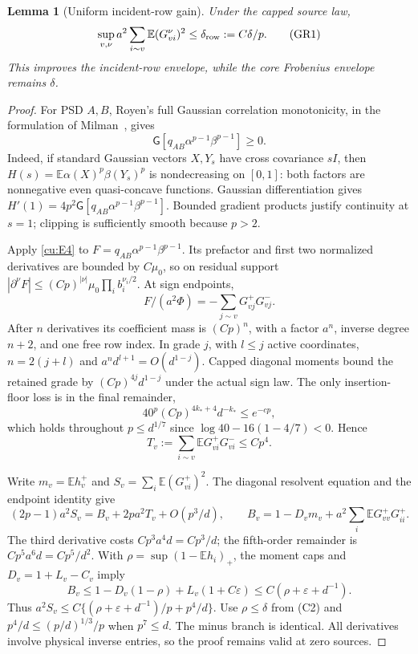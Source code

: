 \documentclass[10pt]{article}
\numberwithin{equation}{section}
\newtheorem{lemma}{Lemma}[section]
\newcommand{\1}{\mathbf1}
\begin{document}
\begin{lemma}[Uniform incident-row gain]\label{lem:global-row-gain}
Under the capped source law,
\[
 \sup_{v,\nu}a^2\sum_{i\sim v}\mathbb E(G^\nu_{vi})^2
 \le\delta_{\rm row}:=C\delta/p.
 \tag{GR1}\label{eq:global-row-gain}
\]
This improves the incident-row envelope, while the core Frobenius
envelope remains $\delta$.
\end{lemma}
\begin{proof}
For PSD $A,B$, Royen's full Gaussian correlation monotonicity,
in the formulation of Milman~\cite[Section 3.3]{Milman}, gives
\[
 \mathsf G[q_{AB}\alpha^{p-1}\beta^{p-1}]\ge0.
\]
Indeed, if standard Gaussian vectors $X,Y_s$ have cross covariance
$sI$, then $H(s)=\mathbb E\alpha(X)^p\beta(Y_s)^p$ is nondecreasing
on $[0,1]$: both factors are nonnegative even quasi-concave functions.
Gaussian differentiation gives
$H'(1)=4p^2\mathsf G[q_{AB}\alpha^{p-1}\beta^{p-1}]$.
Bounded gradient products justify continuity at $s=1$; clipping is
sufficiently smooth because $p>2$.

Apply \eqref{cu:E4} to $F=q_{AB}\alpha^{p-1}\beta^{p-1}$.
Its prefactor and first two normalized derivatives are bounded by
$C\mu_0$, so on residual support
$|\partial^\nu F|\le(Cp)^{|\nu|}\mu_0\prod_i b_i^{\nu_i/2}$.
At sign endpoints,
\[
 F/(a^2\Phi)=-\sum_{j\sim v}G^+_{vj}G^-_{vj}.
\]
After $n$ derivatives its coefficient mass is $(Cp)^n$, with a
factor $a^n$, inverse degree $n+2$, and one free row index.
In grade $j$, with $l\le j$ active coordinates, $n=2(j+l)$ and
$a^nd^{l+1}=O(d^{1-j})$.
Capped diagonal moments bound the retained grade by
$(Cp)^{4j}d^{1-j}$ under the actual sign law.
The only insertion-floor loss is in the final remainder,
\[
 40^p(Cp)^{4k_*+4}d^{-k_*}\le e^{-cp},
\]
which holds throughout $p\le d^{1/7}$ since
$\log40-16(1-4/7)<0$. Hence
\[
 T_v:=\sum_{i\sim v}\mathbb E G^+_{vi}G^-_{vi}\le Cp^4.
\]

Write $m_v=\mathbb Eh_v^+$ and $S_v=\sum_i\mathbb E(G^+_{vi})^2$.
The diagonal resolvent equation and the endpoint identity give
\[
 (2p-1)a^2S_v=B_v+2pa^2T_v+O(p^3/d),\qquad
 B_v=1-D_v m_v+a^2\sum_i\mathbb E G^+_{vv}G^+_{ii}.
\]
The third derivative costs $Cp^3a^4d=Cp^3/d$;
the fifth-order remainder is $Cp^5a^6d=Cp^5/d^2$.
With $\rho=\sup(1-\mathbb Eh_i)_+$, the moment caps and
$D_v=1+L_v-C_v$ imply
\[
 B_v\le1-D_v(1-\rho)+L_v(1+C\varepsilon)
       \le C(\rho+\varepsilon+d^{-1}).
\]
Thus $a^2S_v\le C\{(\rho+\varepsilon+d^{-1})/p+p^4/d\}$.
Use $\rho\le\delta$ from (C2) and
$p^4/d\le(p/d)^{1/3}/p$ when $p^7\le d$.
The minus branch is identical. All derivatives involve physical
inverse entries, so the proof remains valid at zero sources.
\end{proof}
\end{document}
